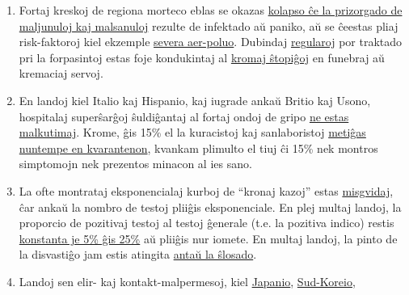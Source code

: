 \begin{enumerate}
{  anstataŭ 9} jaroj. La asertita kresko de la Kawasaki-malsano en
  infanoj ankaŭ
  \href{https://www.societi.org.uk/kawasaki-disease-covid-19/responding-to-press-coverage-28-april-2020/}{montriĝis
  falsa}.
\item
  Fortaj kreskoj de regiona morteco eblas se okazas
  \href{https://swprs.org/covid-19-a-report-from-italy/}{kolapso ĉe la
  prizorgado de maljunuloj kaj malsanuloj} rezulte de infektado aŭ
  paniko, aŭ se ĉeestas pliaj risk-faktoroj kiel ekzemple
  \href{https://www.theguardian.com/environment/2020/apr/20/air-pollution-may-be-key-contributor-to-covid-19-deaths-study}{severa
  aer-poluo}. Dubindaj
  \href{https://www.ecdc.europa.eu/sites/default/files/documents/COVID-19-safe-handling-of-bodies-or-persons-dying-from-COVID19.pdf}{regularoj}
  por traktado pri la forpasintoj estas foje kondukintaj al
  \href{https://www.globalresearch.ca/truth-behind-refrigerated-morgue-truck-stories/5711475}{kromaj
  ŝtopiĝoj} en funebraj aŭ kremaciaj servoj.
\item
  En landoj kiel Italio kaj Hispanio, kaj iugrade ankaŭ Britio kaj
  Usono, hospitalaj superŝarĝoj ŝuldiĝantaj al fortaj ondoj de gripo
  \href{https://off-guardian.org/2020/04/02/coronavirus-fact-check-1-flu-doesnt-overwhelm-our-hospitals/}{ne
  estas malkutimaj}. Krome, ĝis 15\% el la kuracistoj kaj sanlaboristoj
  \href{https://www.nytimes.com/2020/03/24/world/europe/coronavirus-europe-covid-19.html}{metiĝas
  nuntempe en kvarantenon}, kvankam plimulto el tiuj ĉi 15\% nek montros
  simptomojn nek prezentos minacon al ies sano.
\item
  La ofte montrataj eksponencialaj kurboj de ``kronaj kazoj'' estas
  \href{https://www.nytimes.com/2020/03/24/world/europe/coronavirus-europe-covid-19.html}{misgvidaj},
  ĉar ankaŭ la nombro de testoj pliiĝis eksponenciale. En plej multaj
  landoj, la proporcio de pozitivaj testoj al testoj ĝenerale (t.e. la
  pozitiva indico) restis
  \href{https://fivethirtyeight.com/features/coronavirus-case-counts-are-meaningless/}{konstanta
  je 5\% ĝis ​​25\%} aŭ pliiĝis nur iomete. En multaj landoj, la pinto
  de la disvastiĝo jam estis atingita
  \href{https://www.dailymail.co.uk/news/article-8391141/Did-UKs-coronavirus-crisis-peak-lockdown.html}{antaŭ
  la ŝlosado}.
\item
  Landoj sen elir- kaj kontakt-malpermesoj, kiel
  \href{https://www.bloomberg.com/news/articles/2020-05-22/did-japan-just-beat-the-virus-without-lockdowns-or-mass-testing}{Japanio},
  \href{https://www.businessinsider.com/south-korea-coronavirus-testing-death-rate-2020-3?op=1}{Sud-Koreio},

\end{enumerate}
